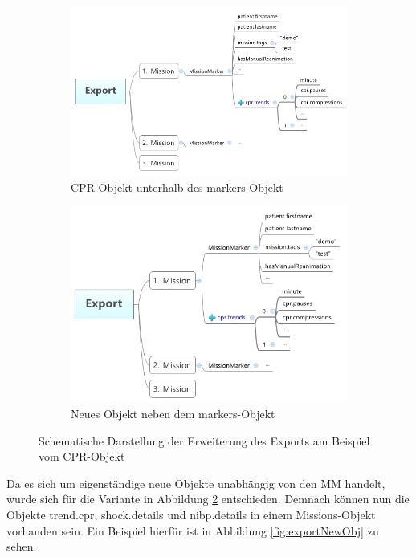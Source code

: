 \begin{figure}[ht]
\begin{subfigure}{.5\linewidth}
  \centering
  \includegraphics[width=.95\linewidth]{img/format1}  
  \caption{CPR-Objekt unterhalb des \glqq markers\grqq-Objekt}
  \label{fig:marker}
\end{subfigure}
\begin{subfigure}{.5\linewidth}
  \centering
  \includegraphics[width=.95\linewidth]{img/format2}  
  \caption{Neues Objekt neben dem \glqq markers\grqq-Objekt}
  \label{fig:mission}
\end{subfigure}
\caption[Beispiel einer Anfrage und Antwort der POST-Methode]{Schematische Darstellung der Erweiterung des Exports am Beispiel vom CPR-Objekt}
\label{fig:tree}
\end{figure}

Da es sich um eigenständige neue Objekte unabhängig von den \gls{MM} handelt, wurde sich für die Variante in Abbildung \ref{fig:mission} entschieden.
Demnach können nun die Objekte \glqq trend.cpr\grqq, \glqq shock.details\grqq{} und \glqq nibp.details\grqq{} in einem Missions-Objekt vorhanden sein.
Ein Beispiel hierfür ist in Abbildung \ref{fig:exportNewObj} zu sehen.


